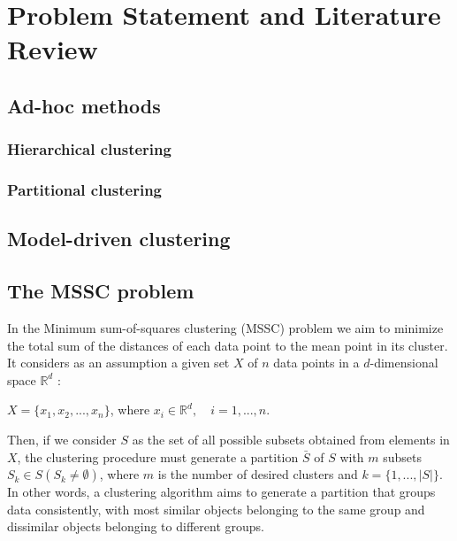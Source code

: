 \chapter{Problem Statement and Literature Review}

\section{Ad-hoc methods}

\subsection{Hierarchical clustering}

\subsection{Partitional clustering}

\section{Model-driven clustering}

\section{The MSSC problem}
In the Minimum sum-of-squares clustering (MSSC) problem we aim to minimize the total sum of the distances of each data point to the mean point in its cluster. It considers as an assumption a given set $X$ of $n$ data points in a $d$-dimensional space $\mathbb{R}^d$ \cite{Bagirov2006}:

\begin{center}%
$X = \{x_1, x_2, ..., x_n\}$, where $x_i \in \mathbb{R}^d, \quad i = 1, ..., n.$
\end{center}

Then, if we consider $S$ as the set of all possible subsets obtained from elements in $X$, the clustering procedure must generate a partition $\bar{S}$ of $S$ with $m$ subsets $S_k \in S (S_k \neq \emptyset)$, where $m$ is the number of desired clusters and $k = \{1,...,\left | S \right |\}$. In other words, a clustering algorithm aims to generate a partition that groups data consistently, with most similar objects belonging to the same group and dissimilar objects belonging to different groups.

